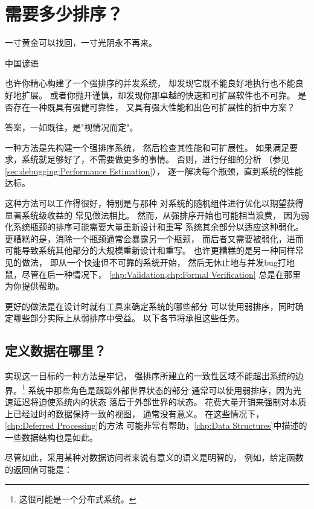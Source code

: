 
\section{需要多少排序？}
\label{sec:app:questions:How Much Ordering Is Needed?}
%
\epigraph{一寸黄金可以找回，一寸光阴永不再来。}
	 {中国谚语}

也许你精心构建了一个强排序的并发系统，
却发现它既不能良好地执行也不能良好地扩展。
或者你抛开谨慎，却发现你那卓越的快速和可扩展软件也不可靠。
是否存在一种既具有强健可靠性，
又具有强大性能和出色可扩展性的折中方案？

答案，一如既往，是"视情况而定"。

一种方法是先构建一个强排序系统，
然后检查其性能和可扩展性。
如果满足要求，系统就足够好了，不需要做更多的事情。
否则，进行仔细的分析
（参见\cref{sec:debugging:Performance Estimation}），
逐一解决每个瓶颈，直到系统的性能达标。

这种方法可以工作得很好，特别是与那种
对系统的随机组件进行优化以期望获得显著系统级收益的
常见做法相比。
然而，从强排序开始也可能相当浪费，
因为弱化系统瓶颈的排序可能需要大量重新设计和重写
系统其余部分以适应这种弱化。
更糟糕的是，消除一个瓶颈通常会暴露另一个瓶颈，
而后者又需要被弱化，进而可能导致系统其他部分的大规模重新设计和重写。
也许更糟糕的是另一种同样常见的做法，
即从一个快速但不可靠的系统开始，
然后无休止地与并发bug打地鼠，尽管在后一种情况下，
\cref{chp:Validation,chp:Formal Verification}
总是在那里为你提供帮助。

更好的做法是在设计时就有工具来确定系统的哪些部分
可以使用弱排序，同时确定哪些部分实际上从弱排序中受益。
以下各节将承担这些任务。

\subsection{定义数据在哪里？}
\label{sec:app:questions:Where is the Defining Data?}

实现这一目标的一种方法是牢记，
强排序所建立的一致性区域不能超出系统的边界。\footnote{
	这很可能是一个分布式系统。}
系统中那些角色是跟踪外部世界状态的部分
通常可以使用弱排序，因为光速延迟将迫使系统内的状态
落后于外部世界的状态。
花费大量开销来强制对本质上已经过时的数据保持一致的视图，
通常没有意义。
在这些情况下，\cref{chp:Deferred Processing}的方法
可能非常有帮助，\cref{chp:Data Structures}中描述的
一些数据结构也是如此。

尽管如此，采用某种对数据访问者来说有意义的语义是明智的，
例如，给定函数的返回值可能是：

